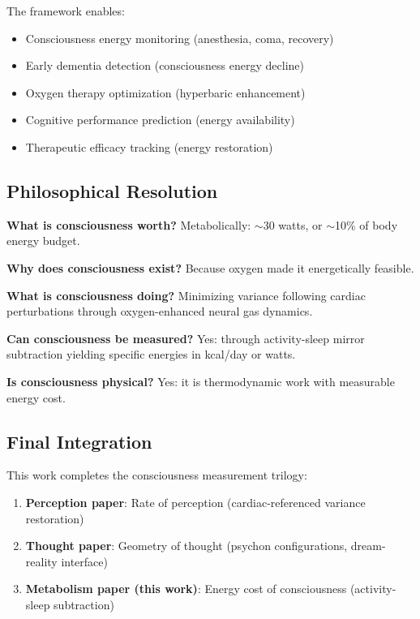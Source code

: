 \documentclass[12pt,twocolumn]{article}
\theoremstyle{remark}
\begin{document}
The framework enables:
\begin{itemize}
\item Consciousness energy monitoring (anesthesia, coma, recovery)
\item Early dementia detection (consciousness energy decline)
\item Oxygen therapy optimization (hyperbaric enhancement)
\item Cognitive performance prediction (energy availability)
\item Therapeutic efficacy tracking (energy restoration)
\end{itemize}

\subsection{Philosophical Resolution}

\textbf{What is consciousness worth?} Metabolically: $\sim$30 watts, or $\sim$10\% of body energy budget.

\textbf{Why does consciousness exist?} Because oxygen made it energetically feasible.

\textbf{What is consciousness doing?} Minimizing variance following cardiac perturbations through oxygen-enhanced neural gas dynamics.

\textbf{Can consciousness be measured?} Yes: through activity-sleep mirror subtraction yielding specific energies in kcal/day or watts.

\textbf{Is consciousness physical?} Yes: it is thermodynamic work with measurable energy cost.

\subsection{Final Integration}

This work completes the consciousness measurement trilogy:

\begin{enumerate}
\item \textbf{Perception paper}: Rate of perception (cardiac-referenced variance restoration)
\item \textbf{Thought paper}: Geometry of thought (psychon configurations, dream-reality interface)
\item \textbf{Metabolism paper (this work)}: Energy cost of consciousness (activity-sleep subtraction)
\end{enumerate}
\end{document}
